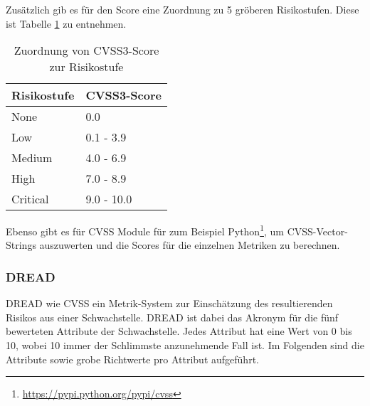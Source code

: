		Zusätzlich gib es für den Score eine Zuordnung zu 5 gröberen Risikostufen. Diese ist Tabelle \ref{tab:cvssToRisk} zu entnehmen.\\
		
		\begin{table}
			\centering
			\begin{tabularx}{5cm}{l | l}
				Risikostufe & CVSS3-Score \\\hline
				None & 0.0 \\
				Low & 0.1 - 3.9 \\
				Medium & 4.0 - 6.9 \\
				High & 7.0 - 8.9 \\
				Critical & 9.0 - 10.0	 \\
			\end{tabularx}
			\caption{Zuordnung von CVSS3-Score zur Risikostufe
			\label{tab:cvssToRisk}
 \cite{FIRSTCVSSSpec}}
		\end{table}
		
		Ebenso gibt es für CVSS Module für zum Beispiel Python\footnote{\url{https://pypi.python.org/pypi/cvss}}, um CVSS-Vector-Strings auszuwerten und die Scores für die einzelnen Metriken zu berechnen.

		\subsubsection{DREAD}
		
		DREAD wie CVSS ein Metrik-System zur Einschätzung des resultierenden Risikos aus einer Schwachstelle. DREAD ist dabei das Akronym für die fünf bewerteten Attribute der Schwachstelle. Jedes Attribut hat eine Wert von 0 bis 10, wobei 10 immer der Schlimmste anzunehmende Fall ist. Im Folgenden sind die Attribute sowie grobe Richtwerte pro Attribut aufgeführt.\cite{DREADOWASP}
		
